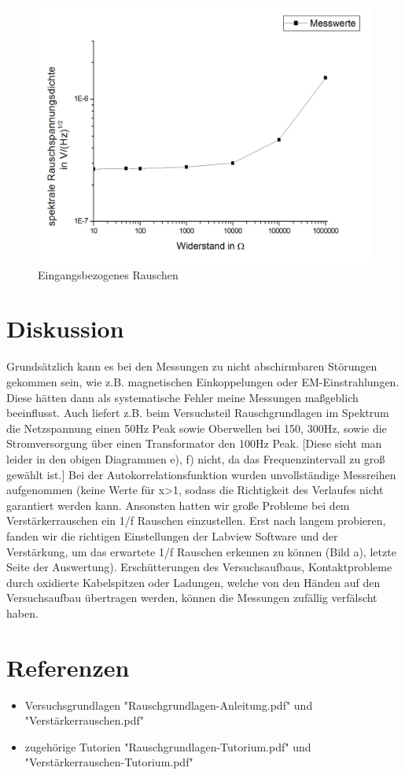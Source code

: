 \documentclass{article}						%
\begin{document}
		\begin{figure}[h!]
			\centering
			\includegraphics[scale=0.4]{EingangsbezogenesRauschen}
			\caption{Eingangsbezogenes Rauschen}
		\end{figure}
		
		\clearpage
\section{Diskussion}

	Grundsätzlich kann es bei den Messungen zu nicht abschirmbaren Störungen gekommen sein, wie z.B. magnetischen Einkoppelungen oder EM-Einstrahlungen. Diese hätten dann als systematische Fehler meine Messungen maßgeblich beeinflusst. Auch liefert z.B. beim Versuchsteil Rauschgrundlagen im Spektrum die Netzspannung einen 50Hz Peak sowie Oberwellen bei 150, 300Hz, sowie die Stromversorgung über einen Transformator den 100Hz Peak. [Diese sieht man leider in den obigen Diagrammen e), f) nicht, da das Frequenzintervall zu groß gewählt ist.] Bei der Autokorrelationsfunktion wurden unvollständige Messreihen aufgenommen (keine Werte für x>1, sodass die Richtigkeit des Verlaufes nicht garantiert werden kann. Ansonsten hatten wir große Probleme bei dem Verstärkerrauschen ein 1/f Rauschen einzustellen. Erst nach langem probieren, fanden wir die richtigen Einstellungen der Labview Software und der Verstärkung, um das erwartete 1/f Rauschen erkennen zu können (Bild a), letzte Seite der Auswertung). Erschütterungen des Versuchsaufbaus, Kontaktprobleme durch oxidierte Kabelspitzen oder Ladungen, welche von den Händen auf den Versuchsaufbau übertragen werden, können die Messungen zufällig verfälscht haben.
	

	
\section{Referenzen}
			\begin{itemize}
			\item Versuchsgrundlagen "Rauschgrundlagen-Anleitung.pdf" und "Verstärkerrauschen.pdf"
			\item zugehörige Tutorien  "Rauschgrundlagen-Tutorium.pdf" und "Verstärkerrauschen-Tutorium.pdf"
\end{itemize}				
\end{document}
